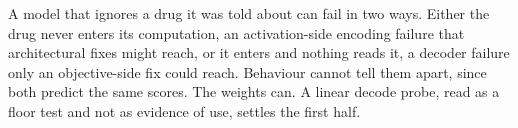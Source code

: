 %


\begin{question}[3]
A model that ignores a drug it was told about can fail in two ways. Either the
drug never enters its computation, an activation-side encoding failure that
architectural fixes might reach, or it enters and nothing reads it, a
decoder failure only an objective-side fix could reach. Behaviour cannot tell
them apart, since both predict the same scores. The weights can. A linear decode
probe, read as a floor test and not as evidence of use, settles the first half.
\end{question}

